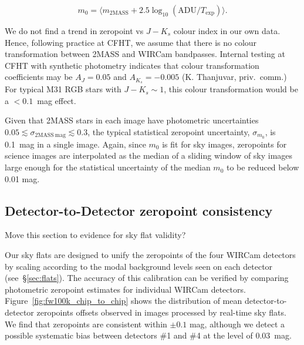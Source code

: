 \documentclass[iop]{emulateapj}
\newcommand{\todo}[1]{\textcolor{BurntOrange}{\textsf{#1}}} %
\newcommand{\mycomment}[1]{\textcolor{OliveGreen}{\textit{#1}}} %
\newcommand{\Fig}[1]{Fig.~\ref{fig:#1}}  %
\newcommand{\Sec}[1]{\S\ref{sec:#1}}  %
\begin{document}
\begin{equation}
  \label{eq:photcal}
  m_0 = \langle m_\mathrm{2MASS} + 2.5 \log_{10}(\mathrm{ADU}/T_\mathrm{exp}) \rangle.
\end{equation}

We do not find a trend in zeropoint vs $J-K_s$ colour index in our own data.
Hence, following practice at CFHT, we assume that there is no colour transformation between 2MASS and WIRCam bandpasses.
Internal testing at CFHT with synthetic photometry indicates that colour transformation coefficients may be $A_J = 0.05$ and $A_{K_s}=-0.005$ (K. Thanjuvar, priv.\ comm.)
For typical M31 RGB stars with $J-K_s\sim 1$, this colour transformation would be a $< 0.1$~mag effect.

Given that 2MASS stars in each image have photometric uncertainties $0.05 \lesssim \sigma_{\mathrm{2MASS~mag}} \lesssim 0.3$, the typical statistical zeropoint uncertainty, $\sigma_{m_0}$, is 0.1~mag in a single image.
Again, since $m_0$ is fit for sky images, zeropoints for science images are interpolated as the median of a sliding window of sky images large enough for the statistical uncertainty of the median $m_0$ to be reduced below 0.01 mag.

\subsection{Detector-to-Detector zeropoint consistency}
\label{sec:detector_zp}

\todo{Move this section to evidence for sky flat validity?}

Our sky flats are designed to unify the zeropoints of the four WIRCam detectors by scaling according to the modal background levels seen on each detector (see~\Sec{flats}).
The accuracy of this calibration can be verified by comparing photometric zeropoint estimates for individual WIRCam detectors.
Figure~\ref{fig:fw100k_chip_to_chip} shows the distribution of mean detector-to-detector zeropoints offsets observed in images processed by real-time sky flats. We find that zeropoints are consistent within $\pm 0.1$ mag, although we detect a possible systematic bias between detectors \#1 and \#4 at the level of $0.03$~mag.
\end{document}
